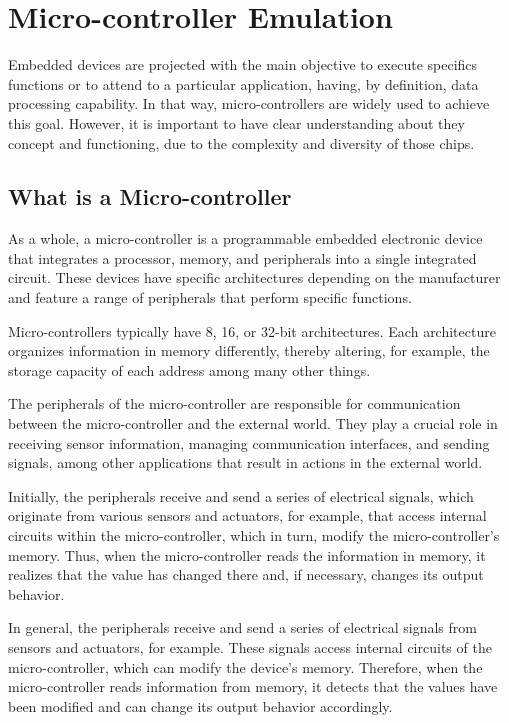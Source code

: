 \documentclass[../monografia.tex]{subfiles}
\begin{document}
\chapter{Micro-controller Emulation}

Embedded devices are projected with the main objective to execute specifics functions or to attend to a particular application, having, by definition, data processing capability. In that way, micro-controllers are widely used to achieve this goal. However, it is important to have clear understanding about they concept and functioning, due to the complexity and diversity of those chips.

\section{What is a Micro-controller}

As a whole, a micro-controller is a programmable embedded electronic device that integrates a processor, memory, and peripherals into a single integrated circuit. These devices have specific architectures depending on the manufacturer and feature a range of peripherals that perform specific functions.

Micro-controllers typically have 8, 16, or 32-bit architectures. Each architecture organizes information in memory differently, thereby altering, for example, the storage capacity of each address among many other things.

The peripherals of the micro-controller are responsible for communication between the micro-controller and the external world. They play a crucial role in receiving sensor information, managing communication interfaces, and sending signals, among other applications that result in actions in the external world.

Initially, the peripherals receive and send a series of electrical signals, which originate from various sensors and actuators, for example, that access internal circuits within the micro-controller, which in turn, modify the micro-controller's memory. Thus, when the micro-controller reads the information in memory, it realizes that the value has changed there and, if necessary, changes its output behavior.

In general, the peripherals receive and send a series of electrical signals from sensors and actuators, for example. These signals access internal circuits of the micro-controller, which can modify the device's memory. Therefore, when the micro-controller reads information from memory, it detects that the values have been modified and can change its output behavior accordingly.
\end{document}
